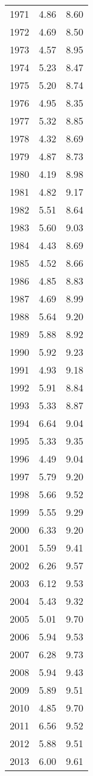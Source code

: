 \begin{longtable}{lrr}
1971 &    4.86 &    8.60 \\
1972 &    4.69 &    8.50 \\
1973 &    4.57 &    8.95 \\
1974 &    5.23 &    8.47 \\
1975 &    5.20 &    8.74 \\
1976 &    4.95 &    8.35 \\
1977 &    5.32 &    8.85 \\
1978 &    4.32 &    8.69 \\
1979 &    4.87 &    8.73 \\
1980 &    4.19 &    8.98 \\
1981 &    4.82 &    9.17 \\
1982 &    5.51 &    8.64 \\
1983 &    5.60 &    9.03 \\
1984 &    4.43 &    8.69 \\
1985 &    4.52 &    8.66 \\
1986 &    4.85 &    8.83 \\
1987 &    4.69 &    8.99 \\
1988 &    5.64 &    9.20 \\
1989 &    5.88 &    8.92 \\
1990 &    5.92 &    9.23 \\
1991 &    4.93 &    9.18 \\
1992 &    5.91 &    8.84 \\
1993 &    5.33 &    8.87 \\
1994 &    6.64 &    9.04 \\
1995 &    5.33 &    9.35 \\
1996 &    4.49 &    9.04 \\
1997 &    5.79 &    9.20 \\
1998 &    5.66 &    9.52 \\
1999 &    5.55 &    9.29 \\
2000 &    6.33 &    9.20 \\
2001 &    5.59 &    9.41 \\
2002 &    6.26 &    9.57 \\
2003 &    6.12 &    9.53 \\
2004 &    5.43 &    9.32 \\
2005 &    5.01 &    9.70 \\
2006 &    5.94 &    9.53 \\
2007 &    6.28 &    9.73 \\
2008 &    5.94 &    9.43 \\
2009 &    5.89 &    9.51 \\
2010 &    4.85 &    9.70 \\
2011 &    6.56 &    9.52 \\
2012 &    5.88 &    9.51 \\
2013 &    6.00 &    9.61 \\
\bottomrule
\end{longtable}
